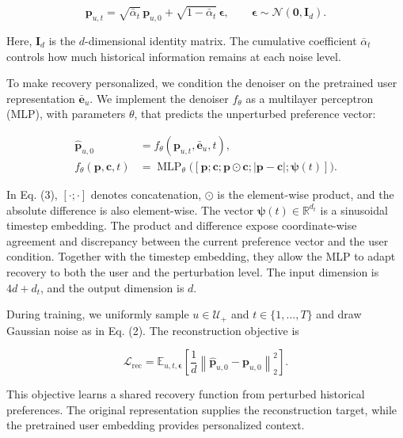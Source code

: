 \documentclass[letterpaper]{article}
\begin{document}
\begin{equation}
\mathbf p_{u,t}
=\sqrt{\bar\alpha_t}\,\mathbf p_{u,0}
+\sqrt{1-\bar\alpha_t}\,\boldsymbol\epsilon,
\qquad
\boldsymbol\epsilon\sim\mathcal N(\mathbf 0,\mathbf I_d).
\tag{2}
\end{equation}

Here, $\mathbf I_d$ is the $d$-dimensional identity matrix. The cumulative coefficient $\bar\alpha_t$ controls how much historical information remains at each noise level.

To make recovery personalized, we condition the denoiser on the pretrained user representation $\bar{\mathbf e}_u$. We implement the denoiser $f_\theta$ as a multilayer perceptron (MLP), with parameters $\theta$, that predicts the unperturbed preference vector:

\begin{equation}
\begin{aligned}
\widehat{\mathbf p}_{u,0}
&=f_\theta(\mathbf p_{u,t},\bar{\mathbf e}_u,t),\\
f_\theta(\mathbf p,\mathbf c,t)
&=\operatorname{MLP}_\theta
\bigl([\mathbf p;\mathbf c;\mathbf p\odot\mathbf c;
|\mathbf p-\mathbf c|;\boldsymbol\psi(t)]\bigr).
\end{aligned}
\tag{3}
\end{equation}

In Eq. (3), $[\cdot;\cdot]$ denotes concatenation, $\odot$ is the element-wise product, and the absolute difference is also element-wise. The vector $\boldsymbol\psi(t)\in\mathbb R^{d_t}$ is a sinusoidal timestep embedding. The product and difference expose coordinate-wise agreement and discrepancy between the current preference vector and the user condition. Together with the timestep embedding, they allow the MLP to adapt recovery to both the user and the perturbation level. The input dimension is $4d+d_t$, and the output dimension is $d$.

During training, we uniformly sample $u\in\mathcal U_+$ and $t\in\{1,\ldots,T\}$ and draw Gaussian noise as in Eq. (2). The reconstruction objective is

\begin{equation}
\mathcal L_{\mathrm{rec}}
=\mathbb E_{u,t,\boldsymbol\epsilon}
\left[
\frac{1}{d}
\left\|\widehat{\mathbf p}_{u,0}-\mathbf p_{u,0}\right\|_2^2
\right].
\tag{4}
\end{equation}

This objective learns a shared recovery function from perturbed historical preferences. The original representation supplies the reconstruction target, while the pretrained user embedding provides personalized context.
\end{document}

